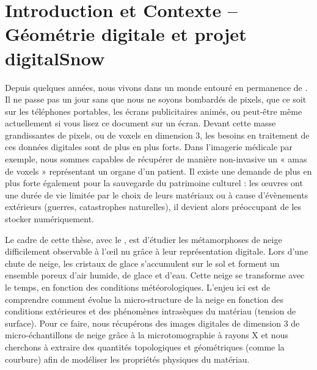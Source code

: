 %
\chapter{Introduction et Contexte -- Géométrie digitale et projet digitalSnow}
\label{sec:introduction}


\setcounter{minitocdepth}{3}
\minitoc

\newpage

Depuis quelques années, nous vivons dans un monde entouré en permanence de
. Il ne passe pas un jour sans que nous ne soyons
bombardés de pixels, que ce soit sur les téléphones portables, les écrans
publicitaires animés, ou peut-être même actuellement si vous lisez ce document
sur un écran. Devant cette masse grandissantes de pixels, ou de voxels en
dimension 3, les besoins en traitement de ces données digitales sont de plus en
plus forts. Dans l'imagerie médicale par exemple, nous sommes capables de
récupérer de manière non-invasive un « amas de voxels » représentant un organe
d'un patient. Il existe une demande de plus en plus forte également pour la
sauvegarde du patrimoine culturel : les œuvres ont une durée de vie limitée par
le choix de leurs matériaux ou à cause d'évènements extérieurs (guerres,
catastrophes naturelles), il devient alors préoccupant de les stocker
numériquement.

Le cadre de cette thèse, avec le , est d'étudier
les métamorphoses de neige difficilement observable à l'œil nu grâce à leur
représentation digitale. Lors d'une chute de neige, les cristaux de glace
s'accumulent sur le sol et forment un ensemble poreux d'air humide, de glace et
d'eau. Cette neige se transforme avec le temps, en fonction des conditions
météorologiques. L'enjeu ici est de comprendre comment évolue la micro-structure
de la neige en fonction des conditions extérieures et des phénomènes intrasèques
du matériau (tension de surface). Pour ce faire, nous récupérons des images
digitales de dimension 3 de micro-échantillons de neige grâce à la
microtomographie à rayons X et nous cherchons à extraire des quantités
topologiques et géométriques (comme la courbure) afin de modéliser les
propriétés physiques du matériau.

